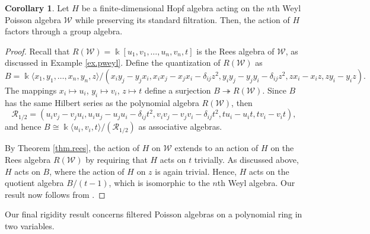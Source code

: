 \documentclass[reqno]{amsart}
\numberwithin{equation}{section}
\theoremstyle{definition}
\newtheorem{corollary}[theorem]{Corollary}
\newcommand\kk{\Bbbk}
\newcommand\cR{\mathcal R}
\newcommand\pw{\mathcal W}
\begin{document}
\begin{corollary}\label{cor.weyl}
Let $H$ be a finite-dimensional Hopf algebra acting on the $n$th Weyl Poisson algebra $\pw$ while preserving its standard filtration. Then, the action of $H$ factors through a group algebra. 
\end{corollary}
\begin{proof}
Recall that $R(\pw)=\kk[u_1,v_1,\ldots,u_n,v_n,t]$ is the Rees algebra of $\pw$, as discussed in Example \ref{ex.pweyl}. Define the quantization of $R(\pw)$ as
\[ B = \kk\langle x_1,y_1,\ldots,x_n,y_n,z\rangle/(x_iy_j-y_jx_i,x_ix_j-x_jx_i-\delta_{ij}z^2,y_iy_j-y_jy_i-\delta_{ij}z^2,zx_i-x_iz,zy_i-y_iz).\]
The mappings $x_i\mapsto u_i$, $y_i\mapsto v_i$, $z\mapsto t$ define a surjection $B \twoheadrightarrow R(\pw)$. Since $B$ has the same Hilbert series as the polynomial algebra $R(\pw)$, then 
\[\cR_{1/2}=(u_iv_j-v_ju_i,u_iu_j-u_ju_i-\delta_{ij}t^2,v_iv_j-v_jv_i-\delta_{ij}t^2,tu_i-u_it,tv_i-v_it),\] 
and hence $B\cong \kk\langle u_i,v_i,t\rangle/(\cR_{1/2})$ as associative algebras.

By Theorem \ref{thm.rees}, the action of $H$ on $\pw$ extends to an action of $H$ on the Rees algebra $R(\pw)$ by requiring that $H$ acts on $t$ trivially. As discussed above, $H$ acts on $B$, where the action of $H$ on $z$ is again trivial. Hence, $H$ acts on the quotient algebra $B/(t-1)$, which is isomorphic to the $n$th Weyl algebra. Our result now follows from \cite[Theorem 1.1]{CEW2}.
\end{proof}

Our final rigidity result concerns filtered Poisson algebras on a polynomial ring in two variables.
\end{document}
